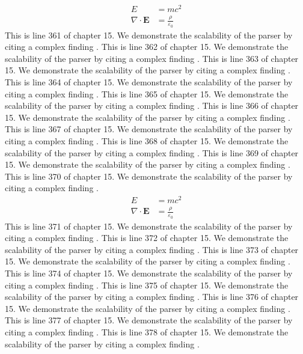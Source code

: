 \begin{align*}
  E &= mc^2 \\
  \nabla \cdot \mathbf{E} &= \frac{\rho}{\varepsilon_0}
\end{align*}
This is line 361 of chapter 15. We demonstrate the scalability of the parser by citing a complex finding \cite{ref15_361}.
This is line 362 of chapter 15. We demonstrate the scalability of the parser by citing a complex finding \cite{ref15_362}.
This is line 363 of chapter 15. We demonstrate the scalability of the parser by citing a complex finding \cite{ref15_363}.
This is line 364 of chapter 15. We demonstrate the scalability of the parser by citing a complex finding \cite{ref15_364}.
This is line 365 of chapter 15. We demonstrate the scalability of the parser by citing a complex finding \cite{ref15_365}.
This is line 366 of chapter 15. We demonstrate the scalability of the parser by citing a complex finding \cite{ref15_366}.
This is line 367 of chapter 15. We demonstrate the scalability of the parser by citing a complex finding \cite{ref15_367}.
This is line 368 of chapter 15. We demonstrate the scalability of the parser by citing a complex finding \cite{ref15_368}.
This is line 369 of chapter 15. We demonstrate the scalability of the parser by citing a complex finding \cite{ref15_369}.
This is line 370 of chapter 15. We demonstrate the scalability of the parser by citing a complex finding \cite{ref15_370}.
\begin{align*}
  E &= mc^2 \\
  \nabla \cdot \mathbf{E} &= \frac{\rho}{\varepsilon_0}
\end{align*}
This is line 371 of chapter 15. We demonstrate the scalability of the parser by citing a complex finding \cite{ref15_371}.
This is line 372 of chapter 15. We demonstrate the scalability of the parser by citing a complex finding \cite{ref15_372}.
This is line 373 of chapter 15. We demonstrate the scalability of the parser by citing a complex finding \cite{ref15_373}.
This is line 374 of chapter 15. We demonstrate the scalability of the parser by citing a complex finding \cite{ref15_374}.
This is line 375 of chapter 15. We demonstrate the scalability of the parser by citing a complex finding \cite{ref15_375}.
This is line 376 of chapter 15. We demonstrate the scalability of the parser by citing a complex finding \cite{ref15_376}.
This is line 377 of chapter 15. We demonstrate the scalability of the parser by citing a complex finding \cite{ref15_377}.
This is line 378 of chapter 15. We demonstrate the scalability of the parser by citing a complex finding \cite{ref15_378}.
